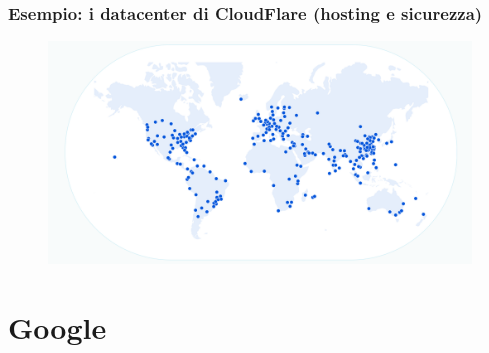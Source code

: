 \documentclass[]{beamer}
\begin{document}
\begin{frame}
\frametitle{Esempio: i datacenter di CloudFlare (hosting e sicurezza)}
\begin{figure}
  \includegraphics[width=\columnwidth]{img/cloudflarenetwork.png}
\end{figure}
\end{frame}

\section{Google}
\end{document}
